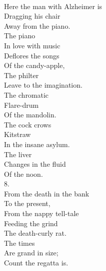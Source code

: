 \documentclass[smalldemyvopaper,11pt,twoside,onecolumn,openright,extrafontsizes]{memoir}
\begin{document}
\\Here the man with Alzheimer is
\\Dragging his chair
\\Away from the piano.
\\The piano
\\In love with music
\\Deflores the songs
\\Of the candy-apple,
\\The philter
\\Leave to the imagination.
\\The chromatic
\\Flare-drum
\\Of the mandolin.
\\The cock crows
\\Kitstraw
\\In the insane asylum.
\\The liver
\\Changes in the fluid
\\Of the noon.
\\8.
\\From the death in the bank
\\To the present,
\\From the nappy tell-tale
\\Feeding the grind
\\The death-curly rat.
\\The times
\\Are grand in size;
\\Count the regatta is.
\end{document}
